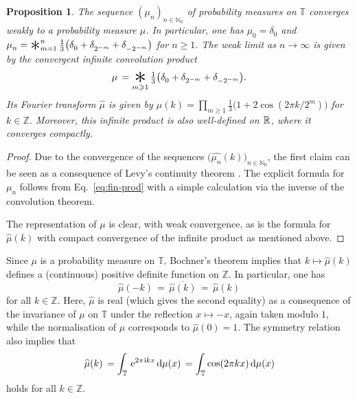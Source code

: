 \documentclass[11pt,a4paper]{amsart}
\theoremstyle{plain}
\newtheorem{prop}[theorem]{Proposition}
\theoremstyle{definition}
\numberwithin{equation}{section}
\newcommand{\dd}{\,\mathrm{d}}
\newcommand{\ii}{\ts\mathrm{i}}
\newcommand{\ee}{\,\mathrm{e}}
\newcommand{\ts}{\hspace{0.5pt}}
\newcommand{\bigconv}{\raisebox{-3pt}{\mbox{\Huge $*$}}}
\newcommand{\medconv}{\raisebox{-2.5pt}{\mbox{\huge $*$}}}
\newcommand{\ZZ}{\mathbb{Z}}
\newcommand{\RR}{\mathbb{R}\ts}
\newcommand{\NN}{\mathbb{N}}
\newcommand{\TT}{\mathbb{T}}
\begin{document}
\begin{prop}\label{prop:gen}
  The sequence\/ $(\mu^{}_n)^{}_{n\in\NN_0}$ of probability measures
  on\/ $\TT$ converges weakly to a probability measure\/ $\mu$.  In
  particular, one has\/ $\mu^{}_0 =\delta^{}_0$ and\/
  $\mu^{}_{n} = \medconv_{m=1}^{n} \, \tfrac{1}{3} \bigl( \delta^{}_0 +
  \delta^{}_{2^{-m}} + \delta^{}_{-2^{-m}} \bigr)$
  for\/ $n\geqslant 1$. The weak limit as\/ $n\to\infty$ is given by
  the convergent infinite convolution product\/
\[
   \mu \,  =  \underset{m\geqslant 1}{\bigconv} 
   \, \tfrac{1}{3} \bigl(
  \delta^{}_0 + \delta^{}_{2^{-m}} + \delta^{}_{-2^{-m}} \bigr).
\]
Its Fourier transform\/ $\widehat{\mu}$ is given by\/
$\widehat{\mu} (k) = \prod_{m\geqslant 1} \frac{1}{3} \bigl( 1 + 2
\cos(2 \pi k/2^m) \bigr)$
for\/ $k\in\ZZ$. Moreover, this infinite product is also well-defined
on\/ $\RR$, where it converges compactly.
\end{prop}

\begin{proof}
  Due to the convergence of the sequences
  $\bigl( \widehat{\mu^{}_n} (k) \bigr)_{n\in\NN_0}$,
  the first claim can be seen as a consequence of Levy's continuity
  theorem \cite[Thm.~3.14]{BF}. The explicit formula for
  $\mu^{}_n$ follows from Eq.~\eqref{eq:fin-prod} with a simple
  calculation via the inverse of the convolution theorem.

  The representation of $\mu$ is clear, with weak convergence,
  as is the formula for $\widehat{\mu} (k)$ with compact convergence
  of the infinite product as mentioned above.
\end{proof}

Since $\mu$ is a probability measure on $\TT$, Bochner's theorem
\cite[Thm.~3.12]{BF} implies that $k \mapsto \widehat{\mu} (k)$ 
defines a (continuous) positive definite function on $\ZZ$. 
In particular, one has
\begin{equation}\label{eq:symm}
    \widehat{\mu} (-k) \, = \, \overline{\widehat{\mu} (k)}
    \, = \, \widehat{\mu} (k)
\end{equation}
for all $k\in\ZZ$. Here, $\widehat{\mu}$ is real (which gives the second
equality) as a consequence of the invariance of $\mu$ on $\TT$ under
the reflection $x\mapsto -x$, again taken modulo $1$, while the
normalisation of $\mu$ corresponds to $\widehat{\mu} (0) = 1$. The
symmetry relation also implies that
\[
     \widehat{\mu} (k) \, = \int_{\TT} \ee^{2 \pi \ii k x} \dd \mu (x)
     \, =  \int_{\TT} \cos (2 \pi k x) \dd \mu (x)
\]
holds for all $k\in\ZZ$.
\end{document}
